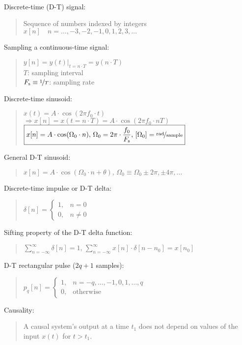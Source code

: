 \documentclass[fontsize=9pt,a4paper,twocolumn]{scrartcl}
\begin{document}
Discrete-time (D-T) signal:
\begin{quote}
	Sequence of numbers indexed by integers\\
	$x[n]\quad n=\dots,-3,-2,-1,0,1,2,3,\dots$
\end{quote}

Sampling a continuous-time signal:
\begin{quote}
	$y[n] = \left. y(t)\right|_{t=n\cdot T} = y(n\cdot T)$\\
	$T$: sampling interval\\
	$F_\mathrm{s}\equiv\nicefrac{1}{T}$: sampling rate
\end{quote}

Discrete-time sinusoid:
\begin{quote}
	$x(t)=A\cdot\cos(2\pi f_0\cdot t)$\\
	$\Rightarrow x[n]=x(t=n\cdot T) = A\cdot\cos(2\pi f_0\cdot nT)$\\
	$\boxed{x[n]=A\cdot\cos(\Omega_0\cdot n),\,\Omega_0=2\pi\cdot\frac{f_0}{F_\mathrm{s}},\,[\Omega_0]=\nicefrac{\mathrm{rad}}{\mathrm{sample}}}$
\end{quote}

General D-T sinusoid:
\begin{quote}
	$x[n]=A\cdot\cos(\Omega_0\cdot n+\theta),\,\Omega_0\equiv\Omega_0\pm 2\pi,\pm 4\pi,\dots$
\end{quote}

Discrete-time impulse or D-T delta:
\begin{quote}
	$\boxed{\delta[n]=\begin{cases}1,& n=0\\0,& n\neq 0\end{cases}}$
\end{quote}

Sifting property of the D-T delta function:
\begin{quote}
	$\boxed{\sum_{n=-\infty}^\infty \delta[n] = 1,\,\sum_{n=-\infty}^\infty x[n]\cdot\delta[n-n_0]=x[n_0]}$
\end{quote}
\newpage
D-T rectangular pulse ($2q+1$ samples):
\begin{quote}
	$\boxed{p_q[n]=\begin{cases}1,& n=-q,\dots,-1,0,1,\dots,q\\ 0,& \text{otherwise}\end{cases}}$
\end{quote}

Causality:
\begin{quote}
	A causal system's output at a time $t_1$ does not depend on values of the input $x(t)$ for $t>t_1$.
\end{quote}
\end{document}
